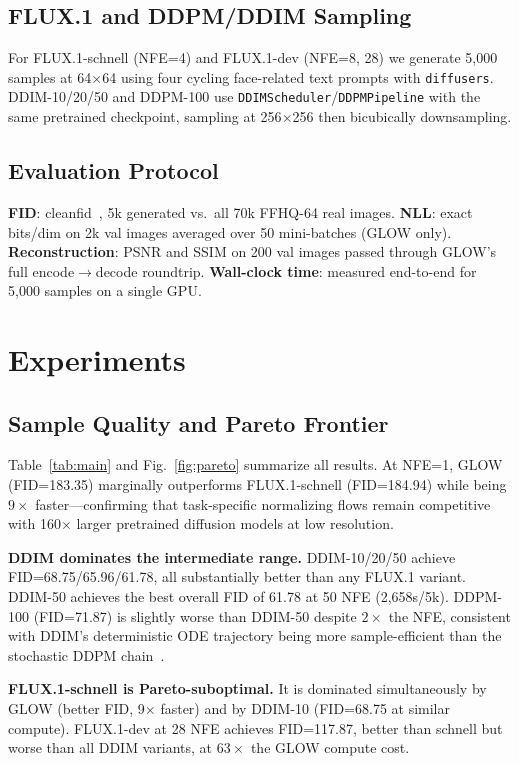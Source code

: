 \documentclass[10pt,twocolumn]{article}
\begin{document}
\subsection{FLUX.1 and DDPM/DDIM Sampling}
For FLUX.1-schnell (NFE=4) and FLUX.1-dev (NFE=8, 28) we generate 5,000 samples at 64$\times$64 using four cycling face-related text prompts with \texttt{diffusers}. DDIM-10/20/50 and DDPM-100 use \texttt{DDIMScheduler}/\texttt{DDPMPipeline} with the same pretrained checkpoint, sampling at 256$\times$256 then bicubically downsampling.

\subsection{Evaluation Protocol}
\textbf{FID}: cleanfid~\cite{parmar2022cleanfid}, 5k generated vs.\ all 70k FFHQ-64 real images. \textbf{NLL}: exact bits/dim on 2k val images averaged over 50 mini-batches (GLOW only). \textbf{Reconstruction}: PSNR and SSIM on 200 val images passed through GLOW's full encode$\to$decode roundtrip. \textbf{Wall-clock time}: measured end-to-end for 5,000 samples on a single GPU.

\section{Experiments}

\subsection{Sample Quality and Pareto Frontier}
Table~\ref{tab:main} and Fig.~\ref{fig:pareto} summarize all results. At NFE=1, GLOW (FID=183.35) marginally outperforms FLUX.1-schnell (FID=184.94) while being $9\times$ faster---confirming that task-specific normalizing flows remain competitive with 160$\times$ larger pretrained diffusion models at low resolution.

\textbf{DDIM dominates the intermediate range.} DDIM-10/20/50 achieve FID=68.75/65.96/61.78, all substantially better than any FLUX.1 variant. DDIM-50 achieves the best overall FID of 61.78 at 50 NFE (2,658s/5k). DDPM-100 (FID=71.87) is slightly worse than DDIM-50 despite $2\times$ the NFE, consistent with DDIM's deterministic ODE trajectory being more sample-efficient than the stochastic DDPM chain~\cite{song2020ddim}.

\textbf{FLUX.1-schnell is Pareto-suboptimal.} It is dominated simultaneously by GLOW (better FID, 9$\times$ faster) and by DDIM-10 (FID=68.75 at similar compute). FLUX.1-dev at 28 NFE achieves FID=117.87, better than schnell but worse than all DDIM variants, at $63\times$ the GLOW compute cost.
\end{document}
